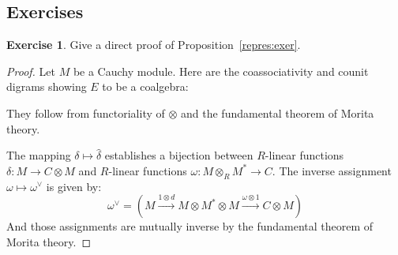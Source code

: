 \documentclass[8pt]{article}
\theoremstyle{definition}
\theoremstyle{definition}
\theoremstyle{definition}
\theoremstyle{definition}
\theoremstyle{definition}
\theoremstyle{definition}
\theoremstyle{definition}
\theoremstyle{definition}
\theoremstyle{definition}
\theoremstyle{definition}
\theoremstyle{definition}
\theoremstyle{definition}
\theoremstyle{definition}
\newtheorem{exercise}{Exercise}[section]
\theoremstyle{definition}
\theoremstyle{question}
\begin{document}
\subsection{Exercises}

\begin{exercise}
  Give a direct proof of Proposition~\ref{repres:exer}.
\end{exercise}

\begin{proof}
  Let $M$ be a Cauchy module. Here are the coassociativity and counit digrams showing $E$ to be a coalgebra:
  \begin{center}
  \end{center}
  They follow from functoriality of $\otimes$ and the fundamental theorem of Morita theory.

  The mapping $\delta \mapsto \hat{\delta}$ establishes a bijection between $R$-linear functions $\delta : M \to C \otimes M$
  and $R$-linear functions $\omega : M \otimes_R M^* \to C$. The inverse assignment $\omega \mapsto \omega^{\lor}$ is given by:
  \[
  \omega^{\lor} = (M \xrightarrow{1 \otimes d} M \otimes M^* \otimes M \xrightarrow{\omega \otimes 1} C \otimes M)
  \]
  And those assignments are mutually inverse by the fundamental theorem of Morita theory.


\end{proof}
\end{document}
